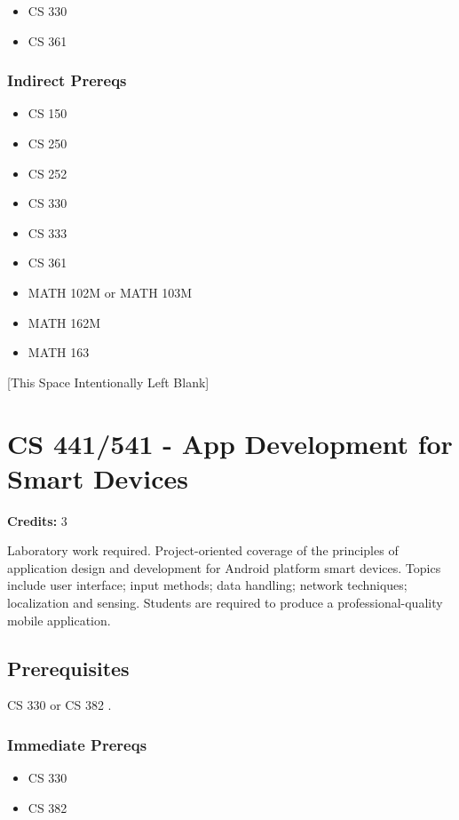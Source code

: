 \documentclass[]{article}
\providecommand{\tightlist}{%
  \setlength{\itemsep}{0pt}\setlength{\parskip}{0pt}}
\newcommand{\pagebreakhere}{
\vspace*{\fill}
\begin{center}
[This Space Intentionally Left Blank]
\end{center}
\vspace*{\fill}
\newpage
}
\begin{document}
\begin{itemize}
\tightlist
\item
  CS 330
\item
  CS 361
\end{itemize}

\subsubsection{Indirect Prereqs}\label{indirect-prereqs-23}

\begin{itemize}
\tightlist
\item
  CS 150
\item
  CS 250
\item
  CS 252
\item
  CS 330
\item
  CS 333
\item
  CS 361
\item
  MATH 102M or MATH 103M
\item
  MATH 162M
\item
  MATH 163
\end{itemize}

\pagebreakhere
\section{CS 441/541 - App Development for Smart
Devices}\label{cs-441541---app-development-for-smart-devices}

\textbf{Credits:} 3

Laboratory work required. Project-oriented coverage of the principles of
application design and development for Android platform smart devices.
Topics include user interface; input methods; data handling; network
techniques; localization and sensing. Students are required to produce a
professional-quality mobile application.

\subsection{Prerequisites}\label{prerequisites-32}

CS 330 or CS 382 .

\subsubsection{Immediate Prereqs}\label{immediate-prereqs-24}

\begin{itemize}
\tightlist
\item
  CS 330
\item
  CS 382
\end{itemize}
\end{document}
